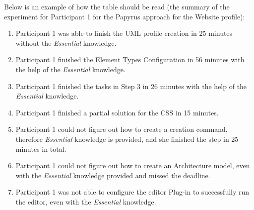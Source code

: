 Below is an example of how the table should be read (the summary of the experiment for Participant 1 for the Papyrus approach for the Website profile):
\begin{enumerate}
	\item Participant 1 was able to finish the UML profile creation in 25 minutes without the \textit{Essential} knowledge. 
	\item Participant 1 finished the Element Types Configuration in 56 minutes with the help of the \textit{Essential} knowledge. 
	
	\item Participant 1 finished the tasks in Step 3 in 26 minutes with the help of the \textit{Essential} knowledge.
	
	\item Participant 1 finished a partial solution for the CSS in 15 minutes.
	\item Participant 1 could not figure out how to create a creation command, therefore \textit{Essential} knowledge is provided, and she finished the step in 25 minutes in total.
	
	\item Participant 1 could not figure out how to create an Architecture model, even with the \textit{Essential} knowledge provided and missed the deadline.
	\item Participant 1 was not able to configure the editor Plug-in to successfully run the editor, even with the \textit{Essential} knowledge. 
	
\end{enumerate}

